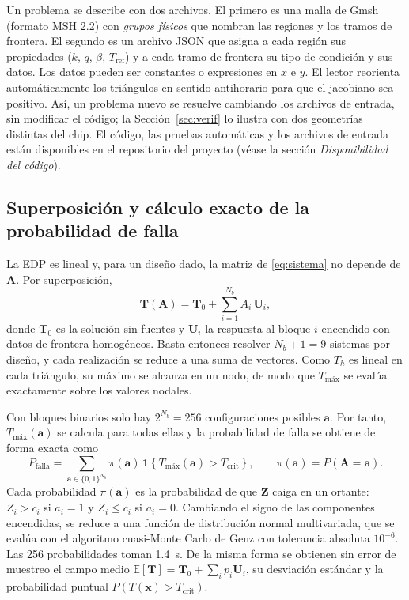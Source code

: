\documentclass[preprint,11pt,sort&compress]{elsarticle}
\newcommand{\Pf}{P_{\mathrm{falla}}}
\newcommand{\Tc}{T_{\mathrm{crit}}}
\newcommand{\Tmax}{T_{\mathrm{máx}}}
\renewcommand{\vec}[1]{\bm{#1}}
\begin{document}
Un problema se describe con dos archivos. El primero es una malla de Gmsh (formato MSH 2.2)
con \emph{grupos físicos} que nombran las regiones y los tramos de frontera. El segundo es
un archivo JSON que asigna a cada región sus propiedades ($k$, $q$, $\beta$,
$T_{\mathrm{ref}}$) y a cada tramo de frontera su tipo de condición y sus datos. Los datos
pueden ser constantes o expresiones en $x$ e $y$. El lector reorienta automáticamente los
triángulos en sentido antihorario para que el jacobiano sea positivo. Así, un problema
nuevo se resuelve cambiando los archivos de entrada, sin modificar el código; la
Sección~\ref{sec:verif} lo ilustra con dos geometrías distintas del chip. El código, las
pruebas automáticas y los archivos de entrada están disponibles en el repositorio del
proyecto (véase la sección \emph{Disponibilidad del código}).

\subsection{Superposición y cálculo exacto de la probabilidad de falla}

La EDP es lineal y, para un diseño dado, la matriz de \eqref{eq:sistema} no depende de
$\vec A$. Por superposición,
\begin{equation}
  \mathbf T(\vec A)=\mathbf T_0+\sum_{i=1}^{N_b} A_i\,\mathbf U_i,
  \label{eq:superposicion}
\end{equation}
donde $\mathbf T_0$ es la solución sin fuentes y $\mathbf U_i$ la respuesta al bloque $i$
encendido con datos de frontera homogéneos. Basta entonces resolver $N_b+1=9$ sistemas por
diseño, y cada realización se reduce a una suma de vectores. Como $T_h$ es lineal en cada
triángulo, su máximo se alcanza en un nodo, de modo que $\Tmax$ se evalúa exactamente
sobre los valores nodales.

Con bloques binarios solo hay $2^{N_b}=256$ configuraciones posibles $\vec a$. Por tanto,
$\Tmax(\vec a)$ se calcula para todas ellas y la probabilidad de falla se obtiene de forma
exacta como
\begin{equation}
  \Pf=\sum_{\vec a\in\{0,1\}^{N_b}}\pi(\vec a)\,\mathbf 1\!\left\{\Tmax(\vec a)>\Tc\right\},
  \qquad \pi(\vec a)=P(\vec A=\vec a).
  \label{eq:enumeracion}
\end{equation}
Cada probabilidad $\pi(\vec a)$ es la probabilidad de que $\vec Z$ caiga en un ortante: $Z_i>c_i$
si $a_i=1$ y $Z_i\le c_i$ si $a_i=0$. Cambiando el signo de las componentes encendidas, se
reduce a una función de distribución normal multivariada, que se evalúa con el algoritmo
cuasi-Monte Carlo de Genz \cite{genz1992mvn} con tolerancia absoluta $10^{-6}$. Las 256
probabilidades toman \SI{1.4}{\second}. De la misma forma se obtienen sin error de muestreo
el campo medio $\mathbb E[\mathbf T]=\mathbf T_0+\sum_i p_i\mathbf U_i$, su desviación
estándar y la probabilidad puntual $P(T(\vec x)>\Tc)$.
\end{document}
